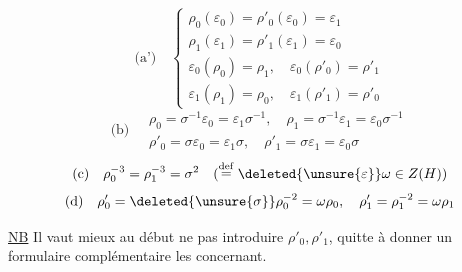 \[
\text{(a')}\quad\left\{\begin{gathered}
\rho_0(\varepsilon_0)=\rho'_0(\varepsilon_0)=\varepsilon_1\\
\rho_1(\varepsilon_1)=\rho'_1(\varepsilon_1)=\varepsilon_0\\[2pt]
\varepsilon_0(\rho_0)=\rho_1,\quad\varepsilon_0(\rho'_0)=\rho'_1\\
\varepsilon_1(\rho_1)=\rho_0,\quad\varepsilon_1(\rho'_1)=\rho'_0
\end{gathered}\right.
\]
\[
\text{(b)}\quad\begin{gathered}
\rho_0=\sigma^{-1}\varepsilon_0=\varepsilon_1\sigma^{-1},\quad\rho_1=\sigma^{-1}\varepsilon_1=\varepsilon_0\sigma^{-1}\\
\rho'_0=\sigma\varepsilon_0=\varepsilon_1\sigma,\quad\rho'_1=\sigma\varepsilon_1=\varepsilon_0\sigma
\end{gathered}
\]
\[
\text{(c)}\quad\rho_0^{-3}=\rho_1^{-3}=\sigma^2\quad(\mathrel{\mathop=^{\rm def}}\deleted{\unsure{\varepsilon}}\omega\in Z(H))
\]
\[
\text{(d)}\quad\rho'_0=\deleted{\unsure{\sigma}}\rho_0^{-2}=\omega\rho_0,\quad\rho'_1=\rho_1^{-2}=\omega\rho_1
\]

\uline{NB} Il vaut mieux au début ne pas introduire $\rho'_0,\rho'_1$, quitte à  donner un formulaire complémentaire les concernant.

